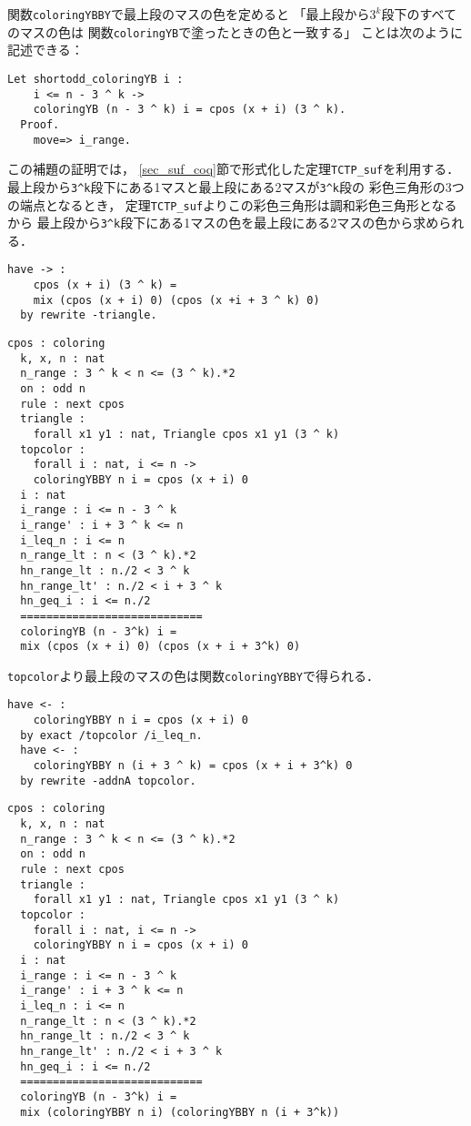 関数{\tt{coloringYBBY}}で最上段のマスの色を定めると
「最上段から$3^k$段下のすべてのマスの色は
  関数{\tt{coloringYB}}で塗ったときの色と一致する」
ことは次のように記述できる：
\begin{lstlisting}[language=Coq]
  Let shortodd_coloringYB i :
    i <= n - 3 ^ k ->
    coloringYB (n - 3 ^ k) i = cpos (x + i) (3 ^ k).
  Proof.
    move=> i_range.
\end{lstlisting}
この補題の証明では，
\ref{sec_suf_coq}節で形式化した定理{\tt{TCTP\_suf}}を利用する．
最上段から{\tt{3\verb|^|k}}段下にある1マスと最上段にある2マスが{\tt{3\verb|^|k}}段の
彩色三角形の3つの端点となるとき，
定理{\tt{TCTP\_suf}}よりこの彩色三角形は調和彩色三角形となるから
最上段から{\tt{3\verb|^|k}}段下にある1マスの色を最上段にある2マスの色から求められる．
\begin{lstlisting}[language=Coq]
  have -> :
    cpos (x + i) (3 ^ k) =
    mix (cpos (x + i) 0) (cpos (x +i + 3 ^ k) 0)
  by rewrite -triangle.
\end{lstlisting}
\begin{lstlisting}[language=Coq]
  cpos : coloring
  k, x, n : nat
  n_range : 3 ^ k < n <= (3 ^ k).*2
  on : odd n
  rule : next cpos
  triangle :
    forall x1 y1 : nat, Triangle cpos x1 y1 (3 ^ k)
  topcolor :
    forall i : nat, i <= n ->
    coloringYBBY n i = cpos (x + i) 0
  i : nat
  i_range : i <= n - 3 ^ k
  i_range' : i + 3 ^ k <= n
  i_leq_n : i <= n
  n_range_lt : n < (3 ^ k).*2
  hn_range_lt : n./2 < 3 ^ k
  hn_range_lt' : n./2 < i + 3 ^ k
  hn_geq_i : i <= n./2
  ============================
  coloringYB (n - 3^k) i =
  mix (cpos (x + i) 0) (cpos (x + i + 3^k) 0)
\end{lstlisting}
{\tt{topcolor}}より最上段のマスの色は関数{\tt{coloringYBBY}}で得られる．
\begin{lstlisting}[language=Coq]
  have <- :
    coloringYBBY n i = cpos (x + i) 0
  by exact /topcolor /i_leq_n.
  have <- :
    coloringYBBY n (i + 3 ^ k) = cpos (x + i + 3^k) 0
  by rewrite -addnA topcolor.
\end{lstlisting}
\begin{lstlisting}[language=Coq]
  cpos : coloring
  k, x, n : nat
  n_range : 3 ^ k < n <= (3 ^ k).*2
  on : odd n
  rule : next cpos
  triangle :
    forall x1 y1 : nat, Triangle cpos x1 y1 (3 ^ k)
  topcolor :
    forall i : nat, i <= n ->
    coloringYBBY n i = cpos (x + i) 0
  i : nat
  i_range : i <= n - 3 ^ k
  i_range' : i + 3 ^ k <= n
  i_leq_n : i <= n
  n_range_lt : n < (3 ^ k).*2
  hn_range_lt : n./2 < 3 ^ k
  hn_range_lt' : n./2 < i + 3 ^ k
  hn_geq_i : i <= n./2
  ============================
  coloringYB (n - 3^k) i =
  mix (coloringYBBY n i) (coloringYBBY n (i + 3^k))
\end{lstlisting}
